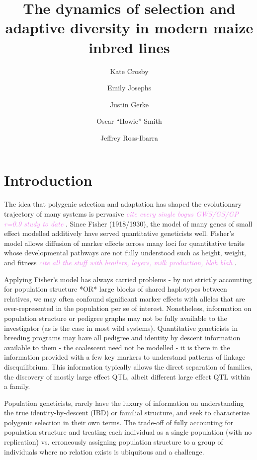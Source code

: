 \documentclass[9pt,twocolumn,twoside]{gsajnl}
\title{The dynamics of selection and adaptive diversity in modern maize inbred lines}
\author[$\ast$,1]{Kate Crosby}
\author[$\ddagger$,1]{Emily Josephs}
\author[$\S$]{Justin Gerke}
\author[$\dagger$]{Oscar ``Howie'' Smith}
\author[$\ddagger$,1]{Jeffrey Ross-Ibarra}
\affil[$\ast$]{Author one affiliation}
\affil[$\S$]{Author two affiliation}
\affil[$\dagger$]{Author three affiliation}
\affil[$\ddagger$]{Author four affiliation}
\newcommand{\kc}[1]{\textcolor{violet}{ \emph{ #1}} }
\begin{document}
\maketitle
\thispagestyle{firststyle}
\marginmark
\firstpagefootnote
{}
\vspace{-11pt}%




\section*{Introduction}

\lettrine[lines=2]{\color{color2}T}{}he idea that polygenic selection and adaptation has shaped the evolutionary trajectory of many systems is pervasive \kc{cite every single bogus GWS/GS/GP r=0.9 study to date}. Since Fisher (1918/1930), the model of many genes of small effect modelled additively have served quantitative geneticists well. Fisher's model allows diffusion of marker effects across many loci for quantitative traits whose developmental pathways are not fully understood such as height, weight, and fitness \kc{cite all the stuff with broilers, layers, milk production, blah blah}.

Applying Fisher's model has always carried problems - by not strictly accounting for population structure *OR* large blocks of shared haplotypes between relatives, we may often confound significant marker effects with alleles that are over-represented in the population per se of interest. Nonetheless, information on population structure or pedigree graphs may not be fully available to the investigator (as is the case in most wild systems). Quantitative geneticists in breeding programs may have all pedigree and identity by descent information available to them - the coalescent need not be modelled - it is there in the information provided with a few key markers to understand patterns of linkage disequilibrium. This information typically allows the direct separation of families, the discovery of mostly large effect QTL, albeit different large effect QTL within a family.

Population geneticists, rarely have the luxury of information on understanding the true identity-by-descent (IBD) or familial structure, and seek to characterize polygenic selection in their own terms. The trade-off of fully accounting for population structure and treating each individual as a single population (with no replication) vs. erroneously assigning population structure to a group of individuals where no relation exists is ubiquitous and a challenge.
\end{document}
